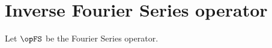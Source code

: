 \section{Inverse Fourier Series operator}
\begin{theorem}
\label{thm:opFSi}
Let $\opFS$ be the Fourier Series operator.
\end{theorem}
